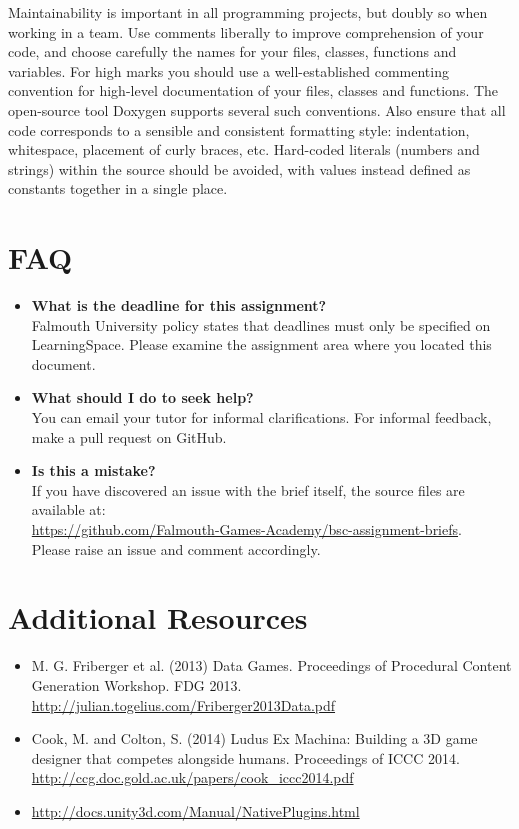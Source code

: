 \documentclass{../fal_assignment}
\begin{document}
Maintainability is important in all programming projects, but doubly so when working in a team. Use comments liberally to improve comprehension of your code, and choose carefully the names for your files, classes, functions and variables. For high marks you should use a well-established commenting convention for high-level documentation of your files, classes and functions. The open-source tool Doxygen supports several such conventions. Also ensure that all code corresponds to a sensible and consistent formatting style: indentation, whitespace, placement of curly braces, etc. Hard-coded literals (numbers and strings) within the source should be avoided, with values instead defined as constants together in a single place.

\section*{FAQ}

\begin{itemize}
	\item 	\textbf{What is the deadline for this assignment?} \\ 
    		Falmouth University policy states that deadlines must only be specified on LearningSpace. Please examine the assignment area where you located this document.
    		
	\item 	\textbf{What should I do to seek help?} \\ 
    		You can email your tutor for informal clarifications. For informal feedback, make a pull request on GitHub. 
    		
    	\item 	\textbf{Is this a mistake?} \\ 	
    		If you have discovered an issue with the brief itself, the source files are available at: \\
    		\url{https://github.com/Falmouth-Games-Academy/bsc-assignment-briefs}.\\
    		 Please raise an issue and comment accordingly.
\end{itemize}

\section*{Additional Resources}

\begin{itemize}
    \item M. G. Friberger et al. (2013) Data Games. Proceedings of Procedural Content Generation Workshop. FDG 2013.
        \url{http://julian.togelius.com/Friberger2013Data.pdf}
    \item Cook, M. and Colton, S. (2014) Ludus Ex Machina: Building a 3D game designer that competes alongside humans. Proceedings of ICCC 2014.
        \url{http://ccg.doc.gold.ac.uk/papers/cook_iccc2014.pdf}
    \item \url{http://docs.unity3d.com/Manual/NativePlugins.html}
\end{itemize}
\end{document}
